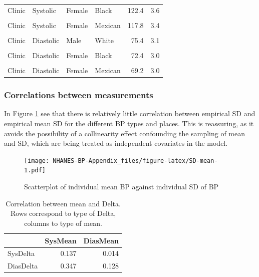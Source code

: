 \documentclass[
]{article}
\begin{document}
\begin{table}[!h]
\begin{tabular}[t]{llllrr}
Clinic & Systolic & Female & Black & 122.4 & 3.6\\
\cellcolor{gray!10}{Clinic} & \cellcolor{gray!10}{Systolic} & \cellcolor{gray!10}{Female} & \cellcolor{gray!10}{White} & \cellcolor{gray!10}{123.5} & \cellcolor{gray!10}{4.1}\\
Clinic & Systolic & Female & Mexican & 117.8 & 3.4\\
\addlinespace
\cellcolor{gray!10}{Clinic} & \cellcolor{gray!10}{Diastolic} & \cellcolor{gray!10}{Male} & \cellcolor{gray!10}{Black} & \cellcolor{gray!10}{77.8} & \cellcolor{gray!10}{3.1}\\
Clinic & Diastolic & Male & White & 75.4 & 3.1\\
\cellcolor{gray!10}{Clinic} & \cellcolor{gray!10}{Diastolic} & \cellcolor{gray!10}{Male} & \cellcolor{gray!10}{Mexican} & \cellcolor{gray!10}{74.9} & \cellcolor{gray!10}{3.2}\\
Clinic & Diastolic & Female & Black & 72.4 & 3.0\\
\cellcolor{gray!10}{Clinic} & \cellcolor{gray!10}{Diastolic} & \cellcolor{gray!10}{Female} & \cellcolor{gray!10}{White} & \cellcolor{gray!10}{70.5} & \cellcolor{gray!10}{3.0}\\
Clinic & Diastolic & Female & Mexican & 69.2 & 3.0\\
\bottomrule
\end{tabular}
\end{table}

\subsubsection{Correlations between measurements}\label{sec:correlations}

In Figure \ref{fig:SD-mean} see that there is relatively little correlation between empirical SD and empirical mean SD for the different BP types and places. This is reassuring, as it avoids the possibility of a collinearity effect confounding the sampling of mean and SD, which are being treated as independent covariates in the model.

\begin{figure}
\centering
\texttt{[image: NHANES-BP-Appendix\_files/figure-latex/SD-mean-1.pdf]}
\caption{\label{fig:SD-mean}Scatterplot of individual mean BP against individual SD of BP}
\end{figure}

\begin{table}

\caption{\label{tab:Delta-mean}Correlation between mean and Delta. Rows correspond to type of Delta, columns to type of mean.}
\centering
\begin{tabular}[t]{lrr}
\toprule
  & SysMean & DiasMean\\
\midrule
SysDelta & 0.137 & 0.014\\
DiasDelta & 0.347 & 0.128\\
\bottomrule
\end{tabular}
\end{table}
\end{document}
